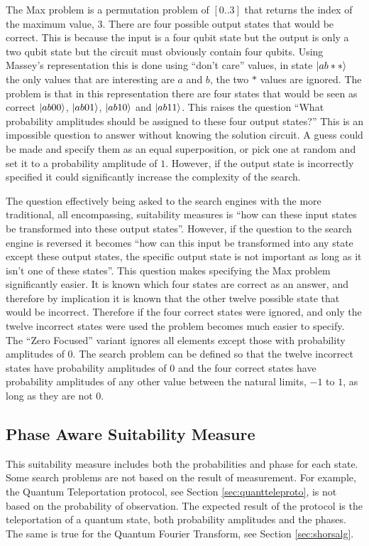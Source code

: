 The Max problem is a permutation problem of $[0..3]$ that returns the index of the maximum value, $3$.
There are four possible output states that would be correct.
This is because the input is a four qubit state but the output is only a two qubit state but the circuit must obviously contain four qubits.
Using Massey's\cite{masseythesis} representation this is done using ``don't care'' values, in state $\left\vert{ab**}\right\rangle$ the only values that are interesting are $a$ and $b$, the two $*$ values are ignored.
The problem is that in this representation there are four states that would be seen as correct $\left\vert{ab00}\right\rangle$, $\left\vert{ab01}\right\rangle$, $\left\vert{ab10}\right\rangle$ and $\left\vert{ab11}\right\rangle$.
This raises the question ``What probability amplitudes should be assigned to these four output states?''
This is an impossible question to answer without knowing the solution circuit.
A guess could be made and specify them as an equal superposition, or pick one at random and set it to a probability amplitude of $1$.
However, if the output state is incorrectly specified it could significantly increase the complexity of the search.

The question effectively being asked to the search engines with the more traditional, all encompassing, suitability measures is ``how can these input states be transformed into these output states''.
However, if the question to the search engine is reversed it becomes ``how can this input be transformed into any state except these output states, the specific output state is not important as long as it isn't one of these states''.
This question makes specifying the Max problem significantly easier.
It is known which four states are correct as an answer, and therefore by implication it is known that the other twelve possible state that would be incorrect.
Therefore if the four correct states were ignored, and only the twelve incorrect states were used the problem becomes much easier to specify.
The ``Zero Focused'' variant ignores all elements except those with probability amplitudes of $0$.
The search problem can be defined so that the twelve incorrect states have probability amplitudes of $0$ and the four correct states have probability amplitudes of any other value between the natural limits, $-1$ to $1$, as long as they are not $0$.

\subsection{Phase Aware Suitability Measure}
\label{sec:phaseawaresuitmeas}
This suitability measure includes both the probabilities and phase for each state.
Some search problems are not based on the result of measurement.
For example, the Quantum Teleportation protocol, see Section \ref{sec:quantteleproto}, is not based on the probability of observation.
The expected result of the protocol is the teleportation of a quantum state, both probability amplitudes and the phases.
The same is true for the Quantum Fourier Transform, see Section \ref{sec:shorsalg}.

